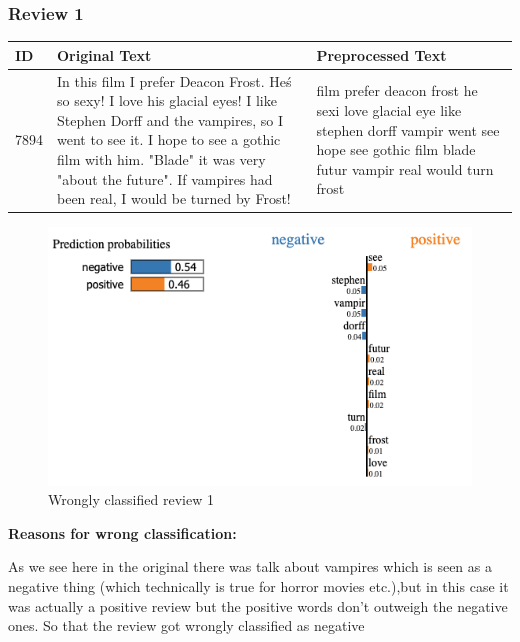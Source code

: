 \newpage
\subsubsection{Review 1}
\begin{tabularx}{\textwidth}{l|X|X}
\textbf{ID} & \textbf{Original Text} & \textbf{Preprocessed Text}\\
\hline
7894 &
In this film I prefer Deacon Frost. He\'s so sexy! I love his glacial eyes! I like Stephen Dorff and the vampires, so I went to see it. I hope to see a gothic film with him. "Blade" it was very "about the future". If vampires had been real, I would be turned by Frost!
&
film prefer deacon frost he sexi love glacial eye like stephen dorff vampir went see hope see gothic film blade futur vampir real would turn frost
\end{tabularx}

\begin{figure}[htb!]
	\includegraphics[width=\textwidth]{img/review_1}
	\caption{Wrongly classified review 1}
\end{figure}
\textbf{Reasons for wrong classification:}

As we see here in the original there was talk about vampires which is seen as a negative thing (which technically is true for horror movies etc.),but in this case it was actually a positive review but the positive words don't outweigh the negative ones.
So that the review got wrongly classified as negative